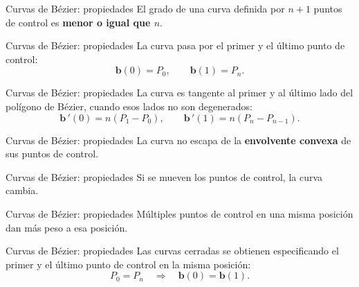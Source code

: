 \documentclass[original_version/main.tex]{subfiles}
\begin{document}
\begin{frame}[t]{Curvas de Bézier: propiedades}
El grado de una curva definida por $n+1$ puntos de control es \textbf{menor o igual que $n$}.
\end{frame}

\begin{frame}[t]{Curvas de Bézier: propiedades}
La curva pasa por el primer y el último punto de control:\[\mathbf b(0)=P_0,\qquad\mathbf b(1)=P_n.\]
\end{frame}

\begin{frame}[t]{Curvas de Bézier: propiedades}
La curva es tangente al primer y al último lado del polígono de Bézier, cuando esos lados no son degenerados:\[\mathbf b\,\!\prime(0)=n(P_1-P_0),\qquad\mathbf b\,\!\prime(1)=n(P_n-P_{n-1}).\]
\end{frame}

\begin{frame}[t]{Curvas de Bézier: propiedades}
La curva no escapa de la \textbf{envolvente convexa} de sus puntos de control.
\end{frame}

\begin{frame}[t]{Curvas de Bézier: propiedades}
Si se mueven los puntos de control, la curva cambia.
\end{frame}

\begin{frame}[t]{Curvas de Bézier: propiedades}
Múltiples puntos de control en una misma posición dan más peso a esa posición.
\end{frame}

\begin{frame}[t]{Curvas de Bézier: propiedades}
Las curvas cerradas se obtienen especificando el primer y el último punto de control en la misma posición:\[P_0=P_n\quad\Longrightarrow\quad\mathbf b(0)=\mathbf b(1).\]\begin{center}\end{center}
\end{frame}
\end{document}
